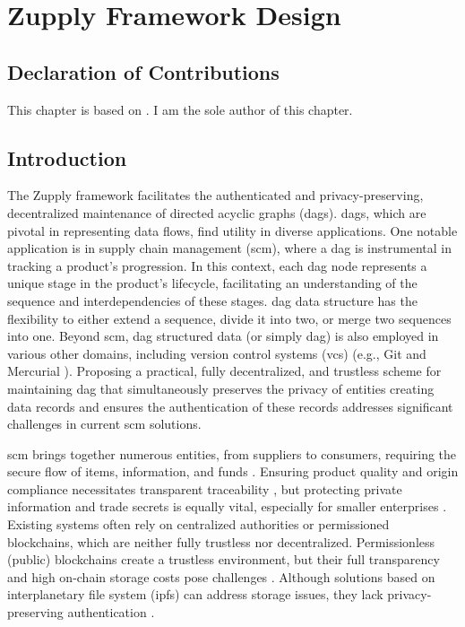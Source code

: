 \chapter{Zupply Framework Design} \label{ch:zupply-design}

\section*{Declaration of Contributions}
This chapter is based on \cite{Badakhshan2024Zupply}. I am the sole author of this chapter.



\section{Introduction}


The Zupply framework facilitates the authenticated and privacy-preserving, decentralized maintenance of directed acyclic graphs (\gls{dag}s). \gls{dag}s, which are pivotal in representing data flows, find utility in diverse applications. One notable application is in supply chain management (\gls{scm}), where a \gls{dag} is instrumental in tracking a product's progression. In this context, each \gls{dag} node represents a unique stage in the product's lifecycle, facilitating an understanding of the sequence and interdependencies of these stages. \gls{dag} data structure has the flexibility to either extend a sequence, divide it into two, or merge two sequences into one. Beyond \gls{scm}, \gls{dag} structured data (or simply \gls{dag}) is also employed in various other domains, including version control systems (\gls{vcs}) (e.g., Git \cite{gitonline2023} and Mercurial \cite{mercurial}). Proposing a practical, fully decentralized, and trustless scheme for maintaining \gls{dag} that simultaneously preserves the privacy of entities creating data records and ensures the authentication of these records addresses significant challenges in current \gls{scm} solutions.

\gls{scm} brings together numerous entities, from suppliers to consumers, requiring the secure flow of items, information, and funds \cite{wisner2021principles}. Ensuring product quality and origin compliance necessitates transparent traceability \cite{SUN2019658}, but protecting private information and trade secrets is equally vital, especially for smaller enterprises \cite{ Winter2023SMEs}. Existing systems often rely on centralized authorities or permissioned blockchains, which are neither fully trustless nor decentralized. Permissionless (public) blockchains create a trustless environment, but their full transparency and high on-chain storage costs pose challenges \cite{ Zhou2022EthereumGraph}. Although solutions based on 
interplanetary file system (\gls{ipfs}) \cite{Benet2014} can address storage issues, they lack privacy-preserving authentication \cite{Khor2023, Musamih2021}. 

